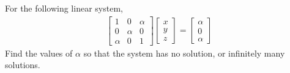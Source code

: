 \begin{Exercise}
For the following linear system,
\begin{align*}
\begin{bmatrix}
1 & 0 & \alpha \\
0 & \alpha & 0 \\
\alpha & 0 & 1
\end{bmatrix}
\begin{bmatrix}
x \\
y \\
z
\end{bmatrix}
=
\begin{bmatrix}
\alpha \\
0 \\
\alpha
\end{bmatrix}   
\end{align*}
Find the values of $\alpha$ so that the system has no solution, or infinitely many solutions.
\end{Exercise}

